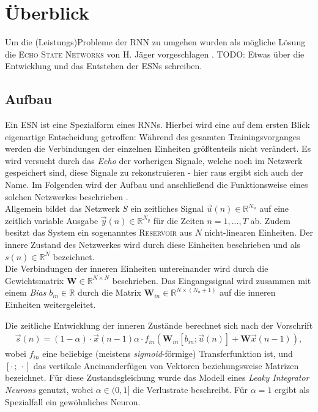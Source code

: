 \section{Überblick}
Um die (Leistungs)Probleme der \textsc{RNN} zu umgehen wurden als mögliche Lösung die \textsc{Echo State Networks} von H. Jäger vorgeschlagen \cite{jaeger2001}.
\textsc{TODO}: Etwas über die Entwicklung und das Entstehen der ESNs schreiben.

\subsection{Aufbau}
Ein \textsc{ESN} ist eine Spezialform eines \textsc{RNN}s. Hierbei wird eine auf dem ersten Blick eigenartige Entscheidung getroffen: Während des gesamten Trainingsvorganges werden die Verbindungen der einzelnen Einheiten größtenteils nicht verändert. Es wird versucht durch das \textit{Echo} der vorherigen Signale, welche noch im Netzwerk gespeichert sind, diese Signale zu rekonstruieren - hier raus ergibt sich auch der Name. Im Folgenden wird der Aufbau und anschließend die Funktionsweise eines solchen Netzwerkes beschrieben \cite{lukoseviciusa2009}.\\

Allgemein bildet das Netzwerk $S$ ein zeitliches Signal $\vec{u}(n) \in \mathbb{R}^{N_u}$  auf eine zeitlich variable Ausgabe $\vec{y}(n) \in \mathbb{R}^{N_y}$ für die Zeiten $n=1, ..., T$ ab. Zudem besitzt das System ein sogenanntes \textsc{Reservoir} aus $N$ nicht-linearen Einheiten. Der innere Zustand des Netzwerkes wird durch diese Einheiten beschrieben und als $s(n) \in \mathbb{R}^{N}$ bezeichnet.\\
Die Verbindungen der inneren Einheiten untereinander wird durch die Gewichtsmatrix $\mathbf{W} \in \mathbb{R}^{N \times N}$ beschrieben. Das Eingangssignal wird zusammen mit einem \textit{Bias} $b_{in} \in \mathbb{R}$ durch die Matrix $\mathbf{W}_{in} \in \mathbb{R}^{N \times (N_u+1)}$ auf die inneren Einheiten weitergeleitet.

Die zeitliche Entwicklung der inneren Zustände berechnet sich nach der Vorschrift
\begin{align}
\label{eq:esn_stateeq}
\vec{s}(n) = (1 - \alpha) \cdot \vec{x}(n-1)  \alpha \cdot f_{in}\left( \mathbf{W}_{in} [b_{in}; \vec{u}(n)] + \mathbf{W} \vec{x}(n-1) \right),
\end{align}
wobei $f_{in}$ eine beliebige (meistens \textit{sigmoid}-förmige) Transferfunktion ist, und $[\cdot\,;\,\cdot]$ das vertikale Aneinanderfügen von Vektoren beziehungsweise Matrizen bezeichnet. Für diese Zustandsgleichung wurde das Modell eines \textit{Leaky Integrator Neurons} genutzt, wobei $\alpha \in (0,1]$ die Verlustrate beschreibt. Für $\alpha=1$ ergibt als Spezialfall ein gewöhnliches Neuron.

